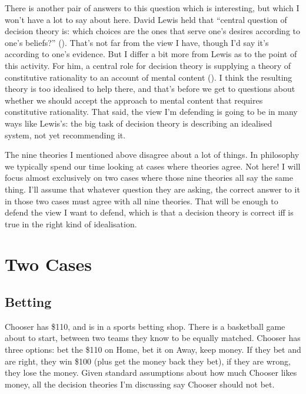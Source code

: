 \documentclass[
  10pt,
  letterpaper,
  DIV=11,
  numbers=noendperiod,
  twoside]{scrartcl}
\begin{document}
There is another pair of answers to this question which is interesting,
but which I won't have a lot to say about here. David Lewis held that
``central question of decision theory is: which choices are the ones
that serve one's desires according to one's beliefs?''
().
That's not far from the view I have, though I'd say it's according to
one's evidence. But I differ a bit more from Lewis as to the point of
this activity. For him, a central role for decision theory is supplying
a theory of constitutive rationality to an account of mental content
(). I think the resulting
theory is too idealised to help there, and that's before we get to
questions about whether we should accept the approach to mental content
that requires constitutive rationality. That said, the view I'm
defending is going to be in many ways like Lewis's: the big task of
decision theory is describing an idealised system, not yet recommending
it.

The nine theories I mentioned above disagree about a lot of things. In
philosophy we typically spend our time looking at cases where theories
agree. Not here! I will focus almost exclusively on two cases where
those nine theories all say the same thing. I'll assume that whatever
question they are asking, the correct answer to it in those two cases
must agree with all nine theories. That will be enough to defend the
view I want to defend, which is that a decision theory is correct iff is
true in the right kind of idealisation.

\section{Two Cases}\label{two-cases}

\subsection{Betting}\label{betting}

Chooser has \$110, and is in a sports betting shop. There is a
basketball game about to start, between two teams they know to be
equally matched. Chooser has three options: bet the \$110 on Home, bet
it on Away, keep money. If they bet and are right, they win \$100 (plus
get the money back they bet), if they are wrong, they lose the money.
Given standard assumptions about how much Chooser likes money, all the
decision theories I'm discussing say Chooser should not bet.
\end{document}

